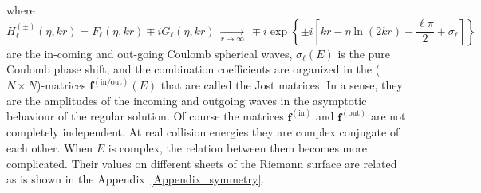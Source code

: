 \documentclass[12pt]{article}
\begin{document}
where
\begin{equation}
\label{Riccati_Coulomb}
   H_\ell^{(\pm)}(\eta,kr)=F_\ell(\eta,kr)\mp iG_\ell(\eta,kr)
   \ \mathop{\longrightarrow}\limits_{r\to\infty}
   \ \mp i\exp\left\{\pm i\left[kr-\eta\ln (2kr)
   -\frac{\ell\pi}{2}+\sigma_\ell\right]\right\}
\end{equation}
are the in-coming and out-going Coulomb spherical waves, $\sigma_\ell(E)$ is the
pure Coulomb phase shift, and the combination coefficients are organized in the
($N\times N$)-matrices $\bm{f}^{\mathrm{(in/out)}}(E)$ that are called the Jost
matrices. In a sense, they are the amplitudes of the incoming and outgoing waves
in the asymptotic behaviour of the regular solution. Of course the matrices
$\bm{f}^{\mathrm{(in)}}$ and $\bm{f}^{\mathrm{(out)}}$ are not completely independent. At
real collision energies they are complex conjugate of each other. When $E$ is
complex, the relation between them becomes more complicated. Their values on
different sheets of the Riemann surface are related as is shown in the
Appendix~\ref{Appendix_symmetry}.

\end{document}
